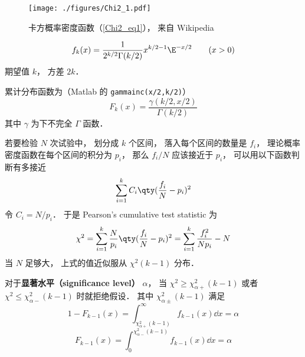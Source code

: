 
\begin{issues}
\issueDraft
\end{issues}

\begin{figure}[ht]
\centering
\texttt{[image: ./figures/Chi2\_1.pdf]}
\caption{卡方概率密度函数（\autoref{Chi2_eq1}）， 来自 Wikipedia} \label{Chi2_fig1}
\end{figure}

\begin{equation}\label{Chi2_eq1}
f_k(x) = \frac{1}{2^{k/2}\Gamma(k/2)}x^{k/2-1}\E^{-x/2} \qquad (x > 0)
\end{equation}
期望值 $k$， 方差 $2k$．

累计分布函数为（Matlab 的 \verb|gammainc(x/2,k/2)|）
\begin{equation}
F_k(x) = \frac{\gamma(k/2, x/2)}{\Gamma(k/2)}
\end{equation}
其中 $\gamma$ 为下不完全 $\Gamma$ 函数．


若要检验 $N$ 次试验中， 划分成 $k$ 个区间， 落入每个区间的数量是 $f_i$， 理论概率密度函数在每个区间的积分为 $p_i$， 那么 $f_i/N$ 应该接近于 $p_i$， 可以用以下函数判断有多接近
\begin{equation}
\sum_{i=1}^k C_i \qty(\frac{f_i}{N} - p_i)^2
\end{equation}
令 $C_i = N/p_i$． 于是 Pearson's cumulative test statistic 为
\begin{equation}
\chi^2 = \sum_{i=1}^k \frac{N}{p_i} \qty(\frac{f_i}{N} - p_i)^2 = \sum_{i=1}^k \frac{f_i^2}{Np_i} - N
\end{equation}
当 $N$ 足够大， 上式的值近似服从 $\chi^2(k-1)$ 分布．

对于\textbf{显著水平（significance level）} $\alpha$， 当 $\chi^2 \geqslant \chi_{\alpha+}^2(k-1)$ 或者 $\chi^2 \leqslant \chi_{\alpha-}^2(k-1)$ 时就拒绝假设． 其中 $\chi_{\alpha\pm}^2(k-1)$ 满足
\begin{equation}
1 - F_{k-1}(x) = \int_{\chi_{\alpha+}^2(k-1)}^\infty f_{k-1}(x) \dd{x} = \alpha
\end{equation}
\begin{equation}
F_{k-1}(x) = \int_0^{\chi_{\alpha-}^2(k-1)} f_{k-1}(x) \dd{x} = \alpha
\end{equation}


